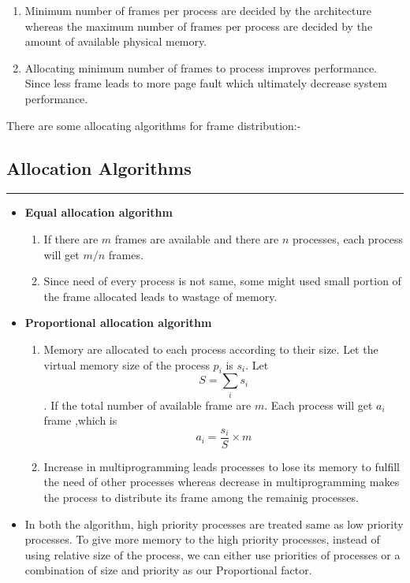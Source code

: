 \documentclass[12pt,onecolumn]{IEEEtran}
\begin{document}
\begin{enumerate}
	\item Minimum number of frames per process are decided by the architecture whereas the maximum number of frames per process are decided by the amount of available physical memory.
	\item Allocating minimum number of frames to process improves performance. Since less frame leads to more page fault which ultimately decrease system performance.
\end{enumerate}
\vspace{3mm}

There are some allocating algorithms for frame distribution:-

\subsection{Allocation Algorithms}
\hrule
\vspace{3mm}

\begin{itemize}
	\item \textbf{Equal allocation algorithm}
	\begin{enumerate}
		\item If there are $m$ frames are available and there are $n$ processes, each process will get $m/n$ frames.
		\item Since need of every process is not same, some might used small portion of the frame allocated leads to wastage of memory.
	\end{enumerate}
	\item \textbf{Proportional allocation algorithm}
	\begin{enumerate}
		\item Memory are allocated to each process according to their size. Let the virtual memory size of the process $p_i$ is $s_i$. Let $$ S  = \sum_i s_i$$. If the total number of available frame are $m$. Each process will get $a_i$ frame ,which is $$a_i = \frac{s_i}{S}\times m$$
		\item Increase in multiprogramming leads processes to lose its memory to fulfill the need of other processes whereas decrease in multiprogramming makes the process to distribute its frame among the remainig processes.
	\end{enumerate}
	\item In both the algorithm, high priority processes are treated same as low priority processes. To give more memory to the high priority processes, instead of using relative size of the process, we can either use priorities of processes or a
	combination of size and priority as our Proportional factor.
\end{itemize}
\end{document}
